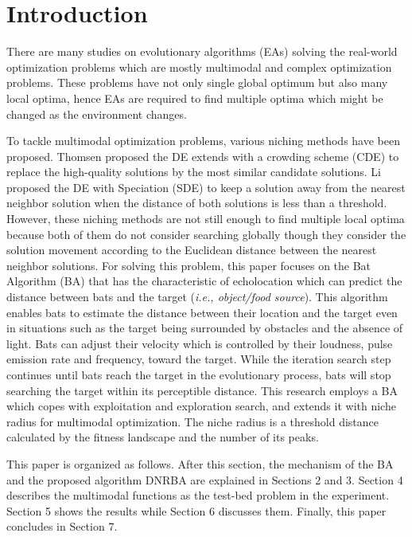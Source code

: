 \section{Introduction}

There are many studies on evolutionary algorithms (EAs) solving the real-world optimization problems which are mostly multimodal and complex optimization problems. These problems have not only single global optimum but also many local optima, hence EAs are required to find multiple optima which might be changed as the environment changes. 

To tackle multimodal optimization problems, various niching methods have been proposed. Thomsen proposed the DE extends with a crowding scheme (CDE) \cite{CDE} to replace the high-quality solutions by the most similar candidate solutions. Li proposed the DE with Speciation (SDE) \cite{SDE} to keep a solution away from the nearest neighbor solution when the distance of both solutions is less than a threshold. However, these niching methods are not still enough to find multiple local optima because both of them do not consider searching globally though they consider the solution movement according to the Euclidean distance between the nearest neighbor solutions. For solving this problem, this paper focuses on the Bat Algorithm (BA) \cite{BA} that has the characteristic of echolocation which can predict the distance between bats and the target (\textit{i.e., object/food source}). This algorithm enables bats to estimate the distance between their location and the target even in situations such as the target being surrounded by obstacles and the absence of light. Bats can adjust their velocity which is controlled by their loudness, pulse emission rate and frequency, toward the target. While the iteration search step continues until bats reach the target in the evolutionary process, bats will stop searching the target within its perceptible distance. This research employs a BA which copes with exploitation and exploration search, and extends it with niche radius for multimodal optimization. The niche radius is a threshold distance calculated by the fitness landscape and the number of its peaks.

This paper is organized as follows. After this section, the mechanism of the BA and the proposed algorithm DNRBA are explained in Sections 2 and 3. Section 4 describes the multimodal functions as the test-bed problem in the experiment. Section 5 shows the results while Section 6 discusses them. Finally, this paper concludes in Section 7.

